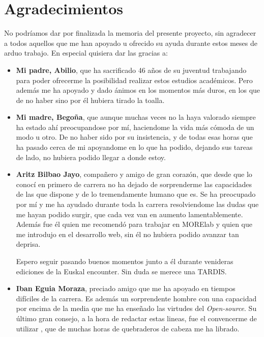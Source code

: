 \chapter*{Agradecimientos}

No podríamos dar por finalizada la memoria del presente proyecto, sin agradecer a todos aquellos que me han apoyado u ofrecido su ayuda durante estos meses de arduo trabajo.
En especial quisiera dar las gracias a: 

\begin{itemize}
	\item \textbf{Mi padre, Abilio}, que ha sacrificado 46 años de su juventud trabajando para poder ofrecerme la posibilidad realizar estos estudios académicos. Pero además me ha apoyado y dado ánimos en los momentos más duros, en los que de no haber sino por él hubiera tirado la toalla.

	\item \textbf{Mi madre, Begoña}, que aunque muchas veces no la haya valorado siempre ha estado ahí preocupandose por mí, haciendome la vida más cómoda de un modo u otro. De no haber sido por su insistencia, y de todas esas horas que ha pasado cerca de mi apoyandome en lo que ha podido, dejando sus tareas de lado, no hubiera podido llegar a donde estoy.

	\item \textbf{Aritz Bilbao Jayo}, compañero y amigo de gran corazón, que desde que lo conocí en primero de carrera no ha dejado de sorprenderme las capacidades de las que dispone y de lo tremendamente humano que es. Se ha preocupado por mí y me ha ayudado durante toda la carrera resolviendome las dudas que me hayan podido surgir, que cada vez van en aumento lamentablemente. 
	Además fue él quien me recomendó para trabajar en MORElab y quien que me introdujo en el desarrollo web, sin él no hubiera podido avanzar tan deprisa.
	
	Espero seguir pasando buenos momentos junto a él durante venideras ediciones de la Euskal encounter. Sin duda se merece una TARDIS.

	\item \textbf{Iban Eguia Moraza}, preciado amigo que me ha apoyado en tiempos difíciles de la carrera. Es además un sorprendente hombre con una capacidad por encima de la media que me ha enseñado las virtudes del \textit{Open-source}. Su último gran consejo, a la hora de redactar estas lineas, fue el convencerme de utilizar , que de muchas horas de quebraderos de cabeza me ha librado.
	

\end{itemize}
